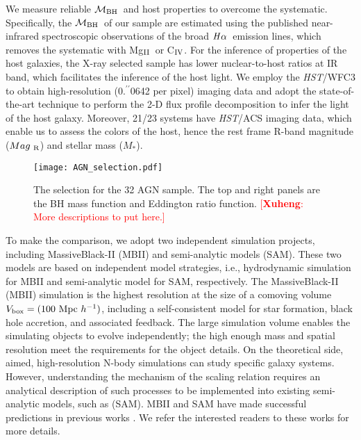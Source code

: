 \documentclass{natureprintstyle}
\newcommand{\hst}{{\it HST}}
\newcommand{\mbh}{$\mathcal M_{\rm BH}$}
\newcommand{\mr}{$Mag_{\rm ~R}$}
\newcommand{\halpha}{${\it H}\alpha$}
\newcommand{\mstar}{{$M_*$}}
\newcommand{\Mgii}{Mg$_{\rm II}$}
\newcommand{\Civ}{C$_{\rm IV}$}
\newcommand{\farcs}{\mbox{\ensuremath{.\!\!^{\prime\prime}}}}%
\newcommand{\ding}[1]{\textcolor{red}{[{\bf Xuheng}: #1]}}
\begin{document}
We measure reliable \mbh\ and host properties to overcome the systematic. Specifically, the \mbh\ of our sample are estimated using the published near-infrared spectroscopic observations of the broad \halpha\ emission lines, which removes the systematic with \Mgii\ or \Civ. For the inference of properties of the host galaxies, the X-ray selected sample has lower nuclear-to-host ratios at IR band, which facilitates the inference of the host light. We employ the \hst/WFC3 to obtain high-resolution (0\farcs0642 per pixel) imaging data and adopt the state-of-the-art technique to perform the 2-D flux profile decomposition to infer the light of the host galaxy. Moreover, 21/23 systems have \hst/ACS imaging data, which enable us to assess the colors of the host, hence the rest frame R-band magnitude (\mr) and stellar mass (\mstar). 

\begin{figure}[t]
\texttt{[image: AGN\_selection.pdf]}
\caption{The selection for the 32 AGN sample. The top and right panels are the BH mass function and Eddington ratio function. \ding{More descriptions to put here.}
}
\label{fig:AGN_select}
\end{figure}

To make the comparison, we adopt two independent simulation projects, including MassiveBlack-II (MBII) and semi-analytic models (SAM). These two models are based on independent model strategies, i.e., hydrodynamic simulation for MBII and semi-analytic model for SAM, respectively. The MassiveBlack-II (MBII) simulation is the highest resolution at the size of a comoving volume $V_{\rm box} = (100~{\rm Mpc}~h^{-1})$, including a self-consistent model for star formation, black hole accretion, and associated feedback. The large simulation volume enables the simulating objects to evolve independently; the high enough mass and spatial resolution meet the requirements for the object details. On the theoretical side, aimed, high-resolution N-body simulations can study specific galaxy systems. However, understanding the mechanism of the scaling relation requires an analytical description of such processes to be implemented into existing semi-analytic models, such as (SAM). 
MBII and SAM have made successful predictions in previous works \cite{Menci2014, Menci2016, Khandai2015}. We refer the interested readers to these works for more details.
\end{document}
